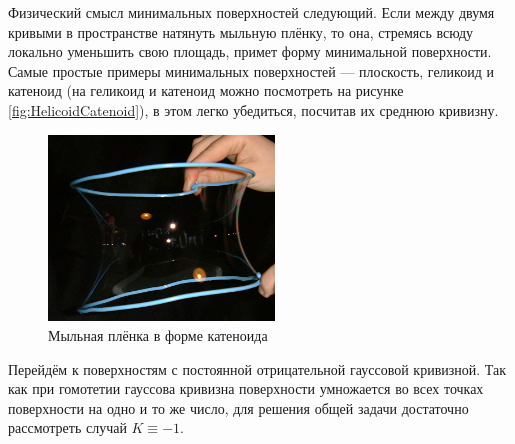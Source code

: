Физический смысл минимальных поверхностей следующий. Если между двумя кривыми в пространстве натянуть мыльную плёнку, то она, стремясь всюду локально уменьшить свою площадь, примет форму минимальной поверхности. Самые простые примеры минимальных поверхностей --- плоскость, геликоид и катеноид (на геликоид и катеноид можно посмотреть на рисунке \ref{fig:HelicoidCatenoid}), в этом легко убедиться, посчитав их среднюю кривизну.

\begin{figure}[H]
	\centering
	\includegraphics[width=6cm]{./img/Membrane.png}
	\caption{Мыльная плёнка в форме катеноида}
\end{figure}

Перейдём к поверхностям с постоянной отрицательной гауссовой кривизной. Так как при гомотетии гауссова кривизна поверхности умножается во всех точках поверхности на одно и то же число, для решения общей задачи достаточно рассмотреть случай $K \equiv -1$.

